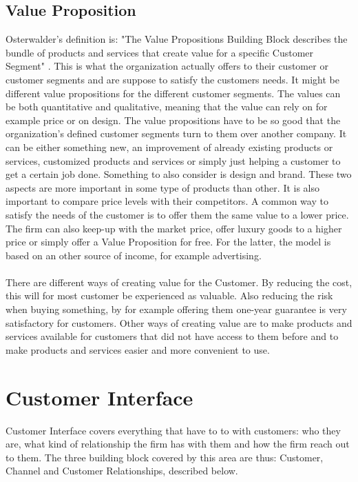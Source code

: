 \subsection{Value Proposition}
Osterwalder's definition is: "The Value Propositions Building Block describes the bundle of products and services that create value for a specific Customer Segment" \cite{osterwalder}. This is what the organization actually offers to their customer or customer segments and are suppose to satisfy the customers needs. It might be different value propositions for the different customer segments. The values can be both quantitative and qualitative, meaning that the value can rely on for example price or on design. The value propositions have to be so good that the organization's defined customer segments turn to them over another company. It can be either something new, an improvement of already existing products or services, customized products and services or simply just helping a customer to get a certain job done. Something to also consider is design and brand. These two aspects are more important in some type of products than other. It is also important to compare price levels with their competitors. A common way to satisfy the needs of the customer is to offer them the same value to a lower price. The firm can also keep-up with the market price, offer luxury goods to a higher price or simply offer a Value Proposition for free. For the latter, the model is based on an other source of income, for example advertising. \\ \\
There are different ways of creating value for the Customer. By reducing the cost, this will for most customer be experienced as valuable. Also reducing the risk when buying something, by for example offering them one-year guarantee is very satisfactory for customers. Other ways of creating value are to make products and services available for customers that did not have access to them before and to make products and services easier and more convenient to use. \cite{osterwalder}


\section{Customer Interface}
Customer Interface covers everything that have to to with customers: who they are, what kind of relationship the firm has with them and how the firm reach out to them. The three building block covered by this area are thus: Customer, Channel and Customer Relationships, described below. \cite{osterwalderthesis}

